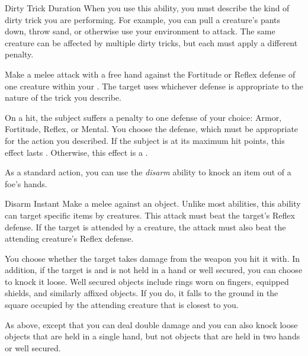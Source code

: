         \begin{durationability}{Dirty Trick}\label{Dirty Trick}
            Duration
            \rankline
            When you use this ability, you must describe the kind of dirty trick you are performing.
            For example, you can pull a creature's pants down, throw sand, or otherwise use your environment to attack.
            The same creature can be affected by multiple dirty tricks, but each must apply a different penalty.

            Make a melee attack with a free hand against the Fortitude or Reflex defense of one creature within your .
            The target uses whichever defense is appropriate to the nature of the trick you describe.

            On a hit, the subject suffers a  penalty to one defense of your choice: Armor, Fortitude, Reflex, or Mental.
            You choose the defense, which must be appropriate for the action you described.
            If the subject is at its maximum hit points, this effect lasts .
            Otherwise, this effect is a .
        \end{durationability}

         As a standard action, you can use the \textit{disarm} ability to knock an item out of a foe's hands.

        \begin{instantability}{Disarm}\label{Disarm}
            Instant
            \rankline
            Make a melee  against an object.
            Unlike most abilities, this ability can target specific items  by creatures.
            This attack must beat the target's Reflex defense.
            If the target is attended by a creature, the attack must also beat the attending creature's Reflex defense.

            \hit You choose whether the target takes damage from the weapon you hit it with.
            In addition, if the target is  and is not held in a hand or well secured, you can choose to knock it loose.
            Well secured objects include rings worn on fingers, equipped shields, and similarly affixed objects.
            If you do, it falls to the ground in the square occupied by the attending creature that is closest to you.

            \crit As above, except that you can deal double damage and you can also knock loose objects that are held in a single hand, but not objects that are held in two hands or well secured.
        \end{instantability}

